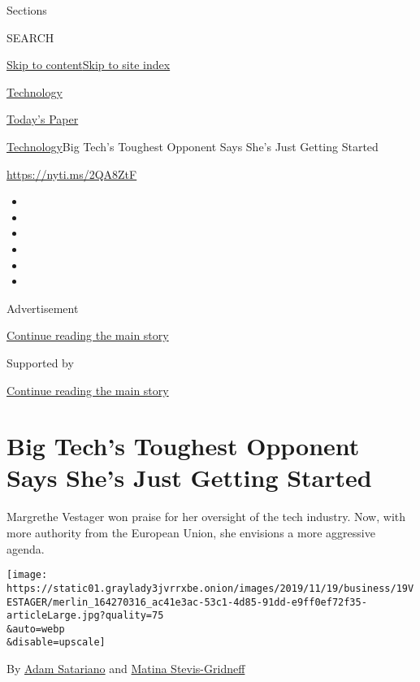 Sections

SEARCH

\protect\hyperlink{site-content}{Skip to
content}\protect\hyperlink{site-index}{Skip to site index}

\href{https://www.nytimes3xbfgragh.onion/section/technology}{Technology}

\href{https://myaccount.nytimes3xbfgragh.onion/auth/login?response_type=cookie\&client_id=vi}{}

\href{https://www.nytimes3xbfgragh.onion/section/todayspaper}{Today's
Paper}

\href{/section/technology}{Technology}\textbar{}Big Tech's Toughest
Opponent Says She's Just Getting Started

\href{https://nyti.ms/2QA8ZtF}{https://nyti.ms/2QA8ZtF}

\begin{itemize}
\item
\item
\item
\item
\item
\item
\end{itemize}

Advertisement

\protect\hyperlink{after-top}{Continue reading the main story}

Supported by

\protect\hyperlink{after-sponsor}{Continue reading the main story}

\hypertarget{big-techs-toughest-opponent-says-shes-just-getting-started}{%
\section{Big Tech's Toughest Opponent Says She's Just Getting
Started}\label{big-techs-toughest-opponent-says-shes-just-getting-started}}

Margrethe Vestager won praise for her oversight of the tech industry.
Now, with more authority from the European Union, she envisions a more
aggressive agenda.

\texttt{[image: https://static01.graylady3jvrrxbe.onion/images/2019/11/19/business/19VESTAGER/merlin\_164270316\_ac41e3ac-53c1-4d85-91dd-e9ff0ef72f35-articleLarge.jpg?quality=75\\\&auto=webp\\\&disable=upscale]}

By \href{https://www.nytimes3xbfgragh.onion/by/adam-satariano}{Adam
Satariano} and
\href{https://www.nytimes3xbfgragh.onion/by/matina-stevis-gridneff}{Matina
Stevis-Gridneff}

